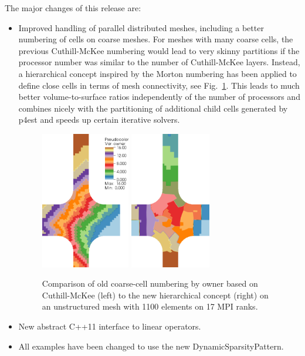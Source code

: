 \documentclass{ansarticle-preprint}
\begin{document}
The major changes of this release are:
\begin{itemize}
\item Improved handling of parallel distributed meshes, including a better
  numbering of cells on coarse meshes. For meshes with many coarse cells, the
  previous Cuthill-McKee numbering would lead to very skinny partitions if the
  processor number was similar to the number of Cuthill-McKee layers. Instead,
  a hierarchical concept inspired by the Morton numbering has been applied to
  define close cells in terms of mesh connectivity, see Fig.~\ref{fig:numbering}. This leads to much better
  volume-to-surface ratios independently of the number of processors and
  combines nicely with the partitioning of additional child cells generated by
  p4est \cite{p4est} and speeds up certain iterative solvers.
\begin{figure}
\centering
\includegraphics[height=6cm]{figures/83_cuthill_mckee_ordering.png}\quad
\includegraphics[height=6cm]{figures/83_hierarchical_ordering.png}
\caption{Comparison of old coarse-cell numbering by owner based on Cuthill-McKee (left) to the new hierarchical concept (right) on an unstructured mesh with 1100 elements on 17 MPI ranks.}
\label{fig:numbering}
\end{figure}
\item New abstract C++11 interface to linear operators.
\item All examples have been changed to use the new DynamicSparsityPattern.

\end{itemize}
\end{document}

